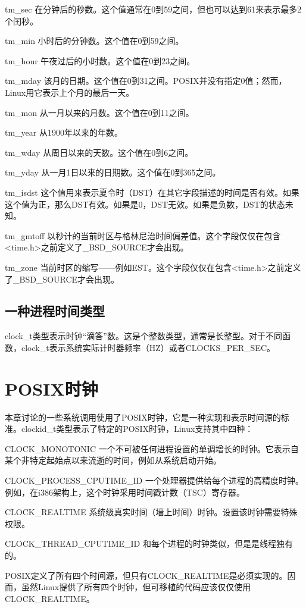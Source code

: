 \begin{eqlist*}
\item [tm\_sec]
在分钟后的秒数。这个值通常在0到59之间，但也可以达到61来表示最多2个闰秒。
\item [tm\_min]
小时后的分钟数。这个值在0到59之间。 
\item [tm\_hour]
午夜过后的小时数。这个值在0到23之间。 
\item [tm\_mday]
该月的日期。这个值在0到31之间。POSIX并没有指定0值；然而，Linux用它表示上个月的最后一天。 
\item [tm\_mon]
从一月以来的月数。这个值在0到11之间。
\item [tm\_year]
从1900年以来的年数。
\item [tm\_wday]
从周日以来的天数。这个值在0到6之间。
\item [tm\_yday]
从一月1日以来的日期数。这个值在0到365之间。
\item [tm\_isdst]
这个值用来表示夏令时（DST）在其它字段描述的时间是否有效。如果这个值为正，那么DST有效。如果是0，DST无效。如果是负数，DST的状态未知。
\item [tm\_gmtoff]
以秒计的当前时区与格林尼治时间偏差值。这个字段仅仅在包含<time.h>之前定义了\_BSD\_SOURCE才会出现。
\item [tm\_zone]
当前时区的缩写——例如EST。这个字段仅仅在包含<time.h>之前定义了\_BSD\_SOURCE才会出现。 
\end{eqlist*}

\subsection{一种进程时间类型}

clock\_t类型表示时钟“滴答”数。这是个整数类型，通常是长整型。对于不同函数，clock\_t表示系统实际计时器频率（HZ）或者CLOCKS\_PER\_SEC。

\section{POSIX时钟}

本章讨论的一些系统调用使用了POSIX时钟，它是一种实现和表示时间源的标准。clockid\_t类型表示了特定的POSIX时钟，Linux支持其中四种：

\begin{eqlist*}
\item [CLOCK\_MONOTONIC]
一个不可被任何进程设置的单调增长的时钟。它表示自某个非特定起始点以来流逝的时间，例如从系统启动开始。
\item [CLOCK\_PROCESS\_CPUTIME\_ID]
一个处理器提供给每个进程的高精度时钟。例如，在i386架构上，这个时钟采用时间戳计数（TSC）寄存器。
\item [CLOCK\_REALTIME]
系统级真实时间（墙上时间）时钟。设置该时钟需要特殊权限。
\item [CLOCK\_THREAD\_CPUTIME\_ID]
和每个进程的时钟类似，但是是线程独有的。
\end{eqlist*}
POSIX定义了所有四个时间源，但只有CLOCK\_REALTIME是必须实现的。因而，虽然Linux提供了所有四个时钟，但可移植的代码应该仅仅使用CLOCK\_REALTIME。 

